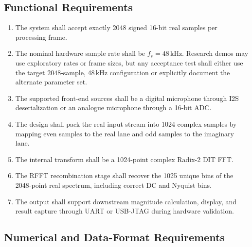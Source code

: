 \documentclass[12pt, a4paper]{article}
\begin{document}
\subsection{Functional Requirements}

\begin{enumerate}[leftmargin=*, label=\textbf{FUN-\arabic*:}]
    \item The system shall accept exactly 2048 signed 16-bit real samples per
          processing frame.
    \item The nominal hardware sample rate shall be $f_s = 48$\,kHz. Research
          demos may use exploratory rates or frame sizes, but any acceptance
          test shall either use the target $2048$-sample, 48\,kHz configuration
          or explicitly document the alternate parameter set.
    \item The supported front-end sources shall be a digital microphone through
          I2S deserialization or an analogue microphone through a 16-bit ADC.
    \item The design shall pack the real input stream into 1024 complex samples
          by mapping even samples to the real lane and odd samples to the
          imaginary lane.
    \item The internal transform shall be a 1024-point complex Radix-2 DIT FFT.
    \item The RFFT recombination stage shall recover the 1025 unique bins of
          the 2048-point real spectrum, including correct DC and Nyquist bins.
    \item The output shall support downstream magnitude calculation, display,
          and result capture through UART or USB-JTAG during hardware
          validation.
\end{enumerate}

\subsection{Numerical and Data-Format Requirements}
\end{document}
